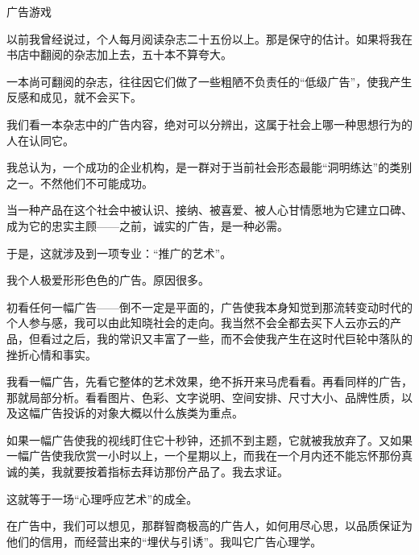 \begin{center}
    \par 广告游戏
\end{center}
\par {}
\par 以前我曾经说过，个人每月阅读杂志二十五份以上。那是保守的估计。如果将我在书店中翻阅的杂志加上去，五十本不算夸大。
\par 一本尚可翻阅的杂志，往往因它们做了一些粗陋不负责任的“低级广告”，使我产生反感和成见，就不会买下。
\par 我们看一本杂志中的广告内容，绝对可以分辨出，这属于社会上哪一种思想行为的人在认同它。
\par 我总认为，一个成功的企业机构，是一群对于当前社会形态最能“洞明练达”的类别之一。不然他们不可能成功。
\par 当一种产品在这个社会中被认识、接纳、被喜爱、被人心甘情愿地为它建立口碑、成为它的忠实主顾——之前，诚实的广告，是一种必需。
\par 于是，这就涉及到一项专业：“推广的艺术”。
\par 我个人极爱形形色色的广告。原因很多。
\par 初看任何一幅广告——倒不一定是平面的，广告使我本身知觉到那流转变动时代的个人参与感，我可以由此知晓社会的走向。我当然不会全都去买下人云亦云的产品，但看过之后，我的常识又丰富了一些，而不会使我产生在这时代巨轮中落队的挫折心情和事实。
\par 我看一幅广告，先看它整体的艺术效果，绝不拆开来马虎看看。再看同样的广告，那就局部分析。看看图片、色彩、文字说明、空间安排、尺寸大小、品牌性质，以及这幅广告投诉的对象大概以什么族类为重点。
\par 如果一幅广告使我的视线盯住它十秒钟，还抓不到主题，它就被我放弃了。又如果一幅广告使我欣赏一小时以上，一个星期以上，而我在一个月内还不能忘怀那份真诚的美，我就要按着指标去拜访那份产品了。我去求证。
\par 这就等于一场“心理呼应艺术”的成全。
\par 在广告中，我们可以想见，那群智商极高的广告人，如何用尽心思，以品质保证为他们的信用，而经营出来的“埋伏与引诱”。我叫它广告心理学。
